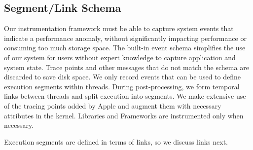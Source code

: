 \subsection{Segment/Link Schema}\label{section: builtin_event_schema}
Our instrumentation framework must be able to capture system events that indicate a performance anomaly, without significantly impacting performance or consuming too much storage space.
The built-in event schema simplifies the use of our system for users without expert knowledge to capture application and system state.
Trace points and other messages that do not match the schema are discarded to save disk space.
We only record events that can be used to define execution segments within threads.
During post-processing, we form temporal links between threads and split execution into segments.
We make extensive use of the tracing points added by Apple and augment them with necessary attributes in the kernel.
Libraries and Frameworks are instrumented only when necessary.

Execution segments are defined in terms of links, so we discuss links next.

